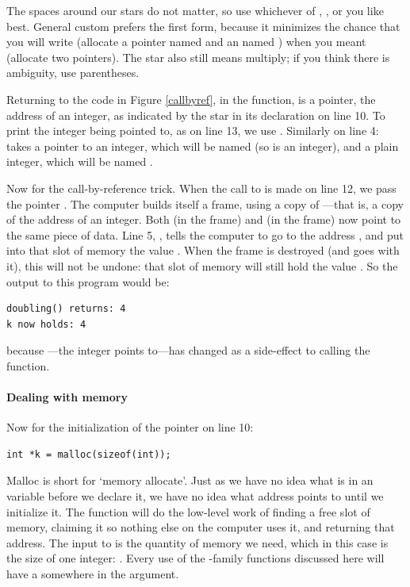 The spaces around our stars do not matter, so use whichever of , , or  you like best. General
custom prefers the first form, because it minimizes the chance that you
will write  (allocate a pointer named 
and an  named ) when you meant  (allocate two pointers). The star also
still means multiply; if you think there is ambiguity, use parentheses.

Returning to the code in Figure \ref{callbyref}, in the 
function,  is a pointer, the address of an integer, as
indicated by the star in its declaration on line 10. To print the integer
being pointed to, as on line 13, we use .
Similarly on line 4:  takes a pointer to an integer,
which will be named  (so  is an integer),
and a plain integer, which will be named
.

Now for the call-by-reference trick.  When the call to 
is made on line 12, we pass the pointer .
The computer builds itself a frame, using a copy of
---that is, a copy of the address of an integer. Both
 (in the  frame) and  (in the
 frame) now point to the same piece of data.  Line 5,
, tells the computer to go to the address
, and put into that slot of memory the value . When the frame is destroyed (and  goes with it),
this will not be undone: that slot of memory will still hold the value
.  So the output to this program would be: 
\begin{lstlisting}
doubling() returns: 4
k now holds: 4
\end{lstlisting}
because ---the integer  points to---has changed as a
side-effect to calling the  function.

\paragraph{Dealing with memory}  
 
Now for the initialization of the pointer on line 10:
\begin{lstlisting}
int *k = malloc(sizeof(int));
\end{lstlisting}
Malloc is short for `memory allocate'. Just as we have no idea what
is in an  variable before we declare it, we have no
idea what address  points to until we initialize it. The
function  will do the low-level work of finding
a free slot of memory, claiming it so nothing else on the computer
uses it, and returning that address. The input to  is the
quantity of memory we need, which in this case is the size of one
integer: . Every use of the -family
functions discussed here will have a  somewhere in the
argument.


